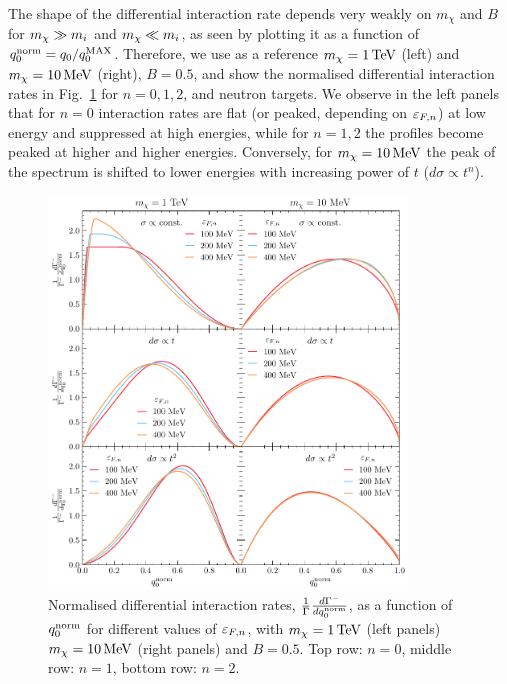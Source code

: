 The shape of the differential interaction rate depends very weakly on $m_\chi$ and $B$ for $m_\chi\gg m_i$ and $m_\chi \ll m_i$, as seen by plotting it as a function of $q_0^{\rm norm}=q_0/q_0^{\rm MAX}$. Therefore, we use as a reference $m_\chi=1\TeV$ (left) and $m_\chi=10\MeV$ (right),  $B=0.5$, and show the normalised differential interaction rates in Fig.~\ref{app:fig:diffgamma} for $n=0,1,2$, and neutron targets.
We observe in the left panels that for $n=0$ interaction rates are flat (or peaked, depending on $\kinFn$) at low energy and suppressed at high energies, while for $n=1,2$ the profiles become peaked at higher and higher energies. Conversely, for $m_\chi=10\MeV$ the peak of the spectrum is shifted to lower energies with increasing power of $t$ ($d\sigma\propto t^n$).

\begin{figure}
    \centering
    \includegraphics[width = 0.85\textwidth]{img/capture_intro/capture_1/norm_diff_intrate_n.pdf}
    \caption[Normalised differential interaction rates, $\frac{1}{\Gamma}\frac{d\Gamma^-}{d\qonorm}$, as a function of $\qonorm$ for different values of $\kinFn$, with $m_\chi=1\TeV$ (left panels) $m_\chi=10\MeV$ (right panels) and $B=0.5$.]{Normalised differential interaction rates, $\frac{1}{\Gamma}\frac{d\Gamma^-}{d\qonorm}$, as a function of $\qonorm$ for different values of $\kinFn$, with $m_\chi=1\TeV$ (left panels) $m_\chi=10\MeV$ (right panels) and $B=0.5$. Top row: $n=0$, middle row: $n=1$, bottom row: $n=2$.}
    \label{app:fig:diffgamma}
\end{figure}

